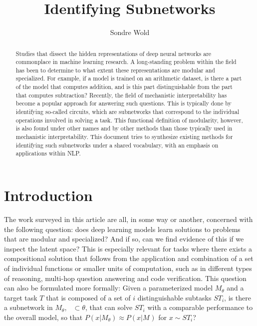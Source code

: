 \documentclass[11pt]{article}
\title{Identifying Subnetworks}
\author{Sondre Wold}
\DeclareMathOperator*{\subnetwork}{\hat{\theta}}
\begin{document}
\maketitle

\begin{abstract}
\noindent
Studies that dissect the hidden representations of deep neural networks are commonplace in machine learning research. A long-standing problem within the field has been to determine to what extent these representations are modular and specialized. For example, if a model is trained on an arithmetic dataset, is there a part of the model that computes addition, and is this part  distinguishable from the part that computes subtraction? Recently, the field of mechanistic interpretability has become a popular approach for answering such questions. This is typically done by identifying so-called circuits, which are subnetworks that correspond to the individual operations involved in solving a task. This functional definition of modularity, however, is also found under other names and by other methods than those typically used in mechanistic interpretability. This document tries to synthesize existing methods for identifying such subnetworks under a shared vocabulary, with an emphasis on applications within NLP.
\end{abstract}

\section{Introduction}

The work surveyed in this article are all, in some way or another, concerned with the following question: does deep learning models learn solutions to problems that are modular and specialized? And if so, can we find evidence of this if we inspect the latent space? This is especially relevant for tasks where there exists a compositional solution that follows from the application and combination of a set of individual functions or smaller units of computation, such as in different types of reasoning, multi-hop question answering and code verification. This question can also be formulated more formally: Given a parameterized model $M_\theta$ and a target task $T$ that is composed of a set of $i$ distinguishable subtasks $ST_i$, is there a subnetwork in $M_\theta$, $\subnetwork \subset \theta$, that can solve $ST_i$ with a comparable performance to the overall model, so that $P(x | M_\theta) \approx P(x | M_{\subnetwork})$ for $x \sim ST_i$? 
\end{document}
